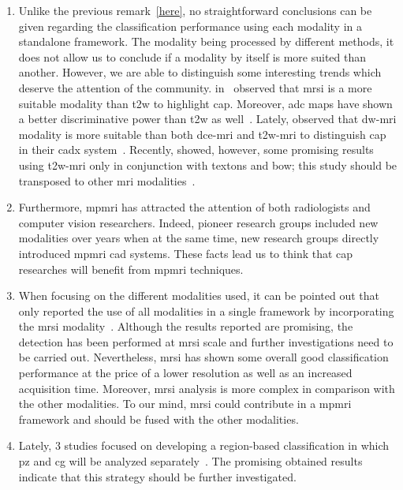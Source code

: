 \begin{enumerate}
\item Unlike the previous remark~\ref{here}, no straightforward conclusions can be given regarding the classification performance using each modality in a standalone framework.
The modality being processed by different methods, it does not allow us to conclude if a modality by itself is more suited than another.
However, we are able to distinguish some interesting trends which deserve the attention of the community.
\citeauthor{Tiwari2013} in~\cite{Tiwari2009a,Tiwari2012,Tiwari2013} observed that \ac{mrsi} is a more suitable modality than \ac{t2w} to highlight \ac{cap}.
Moreover, \ac{adc} maps have shown a better discriminative power than \ac{t2w} as well~\cite{Langer2009,Viswanath2011,Peng2013}.
Lately, \citeauthor{Litjens2014} observed that \ac{dw}-\ac{mri} modality is more suitable than both \ac{dce}-\ac{mri} and \ac{t2w}-\ac{mri} to distinguish \ac{cap} in their \ac{cadx} system~\cite{Litjens2014}. 
Recently, \citeauthor{rampun2016computerb} showed, however, some promising results using \ac{t2w}-\ac{mri} only in conjunction with textons and \ac{bow}; this study should be transposed to other \ac{mri} modalities~\cite{rampun2016computerb}.

\item Furthermore, \ac{mpmri} has attracted the attention of both radiologists and computer vision researchers.
Indeed, pioneer research groups included new modalities over years when at the same time, new research groups directly introduced \ac{mpmri} \ac{cad} systems.
These facts lead us to think that \ac{cap} researches will benefit from \ac{mpmri} techniques.

\item When focusing on the different modalities used, it can be pointed out that only \citeauthor{trigui2017automatic} reported the use of all modalities in a single framework by incorporating the \ac{mrsi} modality~\cite{trigui2016classification,trigui2017automatic}.
Although the results reported are promising, the detection has been performed at \ac{mrsi} scale and further investigations need to be carried out.
Nevertheless, \ac{mrsi} has shown some overall good classification performance at the price of a lower resolution as well as an increased acquisition time.
Moreover, \ac{mrsi} analysis is more complex in comparison with the other modalities.
To our mind, \ac{mrsi} could contribute in a \ac{mpmri} framework and should be fused with the other modalities.

\item Lately, 3 studies focused on developing a region-based classification in which \ac{pz} and \ac{cg} will be analyzed separately~\cite{Viswanath2012,Litjens2012,Litjens2014}.
The promising obtained results indicate that this strategy should be further investigated.


\end{enumerate}
